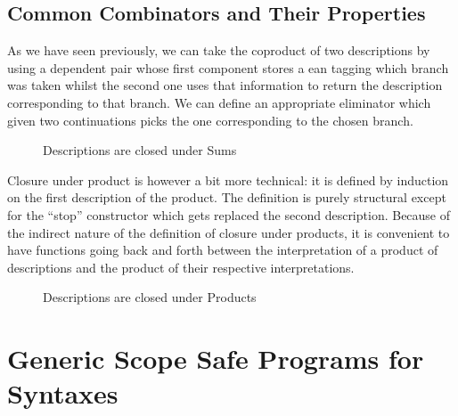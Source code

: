 \subsection{Common Combinators and Their Properties}\label{desccomb}

As we have seen previously, we can take the coproduct of two
descriptions by using a dependent pair whose first component
stores a ean tagging which branch was taken whilst
the second one uses that information to return the description
corresponding to that branch. We can define an appropriate
eliminator  which given two continuations picks the
one corresponding to the chosen branch.

\begin{figure}[h]
\begin{minipage}{0.45\textwidth}
\end{minipage}\hspace{2em}
\begin{minipage}{0.45\textwidth}
\end{minipage}
\caption{Descriptions are closed under Sums}
\end{figure}

Closure under product is however a bit more technical: it is
defined by induction on the first description of the product.
The definition is purely structural except for the ``stop''
constructor which gets replaced the second description. Because
of the indirect nature of the definition of closure under
products, it is convenient to have functions going back and
forth between the interpretation of a product of descriptions
and the product of their respective interpretations.

\begin{figure}[h]
\begin{minipage}{0.45\textwidth}
\end{minipage}\hspace{2em}
\begin{minipage}{0.45\textwidth}
\end{minipage}
\caption{Descriptions are closed under Products}
\end{figure}


\section{Generic Scope Safe Programs for Syntaxes}\label{section:semantics}

